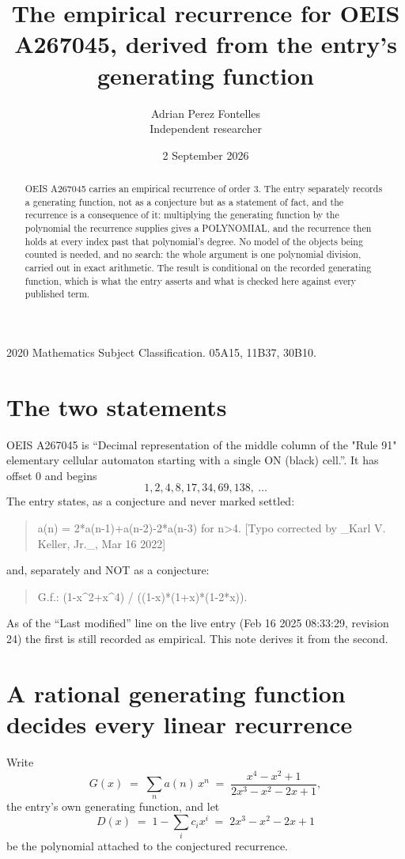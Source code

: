 \documentclass[11pt,a4paper]{article}
\title{The empirical recurrence for OEIS A267045, derived from the entry's generating function}
\author{Adrian Perez Fontelles\\ \small Independent researcher}
\date{2 September 2026}
\theoremstyle{plain}
\theoremstyle{definition}
\begin{document}
\maketitle

\begin{abstract}
OEIS A267045 carries an empirical recurrence of order $3$. The entry separately records a
generating function, not as a conjecture but as a statement of fact, and the recurrence is a
consequence of it: multiplying the generating function by the polynomial the recurrence
supplies gives a POLYNOMIAL, and the recurrence then holds at every index past that
polynomial's degree. No model of the objects being counted is needed, and no search: the
whole argument is one polynomial division, carried out in exact arithmetic. The result is
conditional on the recorded generating function, which is what the entry asserts and what is
checked here against every published term.
\end{abstract}

\noindent\small 2020 Mathematics Subject Classification. 05A15, 11B37, 30B10.\normalsize

\section{The two statements}

OEIS A267045 is ``Decimal representation of the middle column of the "Rule 91" elementary cellular automaton starting with a single ON (black) cell.''. It has offset $0$ and begins
\[
1, 2, 4, 8, 17, 34, 69, 138,\ \dots
\]
The entry states, as a conjecture and never marked settled:
\begin{quote}
a(n) = 2*a(n-1)+a(n-2)-2*a(n-3) for n>4. [Typo corrected by \_Karl V. Keller, Jr.\_, Mar 16 2022]
\end{quote}
and, separately and NOT as a conjecture:
\begin{quote}
G.f.: (1-x\^{}2+x\^{}4) / ((1-x)*(1+x)*(1-2*x)).
\end{quote}
As of the ``Last modified'' line on the live entry (Feb 16 2025 08:33:29, revision 24) the first is still
recorded as empirical. This note derives it from the second.

\section{A rational generating function decides every linear recurrence}

Write
\[
G(x)\;=\;\sum_{n}a(n)\,x^{n}\;=\;\frac{x^{4} - x^{2} + 1}{2 x^{3} - x^{2} - 2 x + 1},
\]
the entry's own generating function, and let
\[
D(x)\;=\;1-\sum_i c_i x^{i}\;=\;2 x^{3} - x^{2} - 2 x + 1
\]
be the polynomial attached to the conjectured recurrence.
\end{document}
